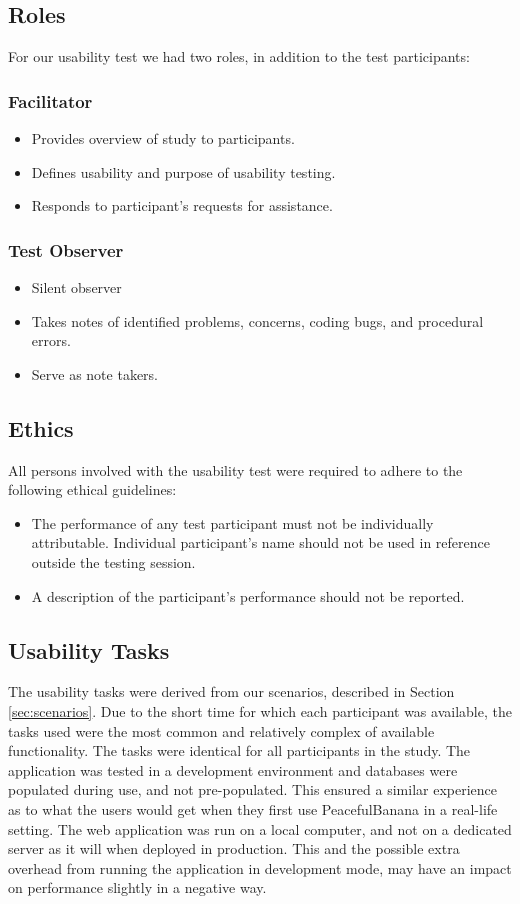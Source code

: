 \subsection{Roles}
For our usability test we had two roles, in addition to the test participants:
\subsubsection{Facilitator}
	\begin{itemize}
		\item Provides overview of study to participants.
		\item Defines usability and purpose of usability testing.
		\item Responds to participant's requests for assistance.
	\end{itemize}
\subsubsection{Test Observer}
	\begin{itemize}
		\item Silent observer
		\item Takes notes of identified problems, concerns, coding bugs, and procedural errors.
		\item Serve as note takers.
	\end{itemize}

\subsection{Ethics}
All persons involved with the usability test were required to adhere to the following ethical guidelines:
\begin{itemize}
	\item The performance of any test participant must not be individually attributable. Individual participant's name should not be used in reference outside the testing session.
	\item A description of the participant's performance should not be reported. 
\end{itemize}

\subsection{Usability Tasks}
The usability tasks were derived from our scenarios, described in Section \ref{sec:scenarios}. Due to the short time for which each participant was available, the tasks used were the most common and relatively complex of available functionality. The tasks were identical for all participants in the study.
The application was tested in a development environment and databases were populated during use, and not pre-populated. This ensured a similar experience as to what the users would get when they first use PeacefulBanana in a real-life setting. The web application was run on a local computer, and not on a dedicated server as it will when deployed in production. This and the possible extra overhead from running the application in development mode, may have an impact on performance slightly in a negative way.

